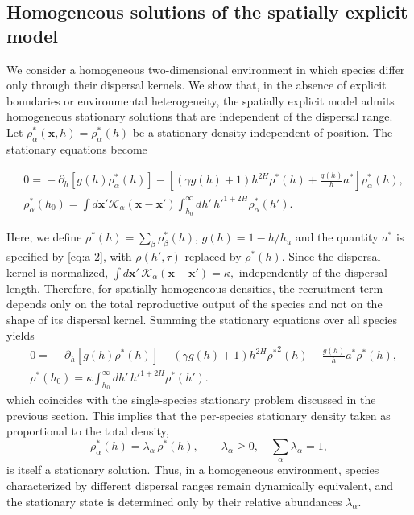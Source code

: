 \documentclass[aps,pre,twocolumn,superscriptaddress,10pt]{revtex4-2}
\begin{document}
\subsection*{Homogeneous solutions of the spatially explicit model}
We consider a homogeneous two-dimensional environment in which species differ only through their dispersal kernels. We show that, in the absence of explicit boundaries or environmental heterogeneity, the spatially explicit model admits homogeneous stationary solutions that are independent of the dispersal range.
Let $\rho_\alpha^*(\mathbf{x},h)=\rho_\alpha^*(h)$
be a stationary density independent of position. The stationary equations become
\begin{widetext}
\begin{align}
&\!\!\!0 =\!-\partial_h\!\left[g(h)\rho_\alpha^*(h)\right]\!-\!\left[\left(\gamma g(h)\!+\!1\right)h^{2H}\!\rho^*(h)\!+\!\frac{g(h)}{h}a^*\right]\rho_\alpha^*(h), \\
&\!\!\!\rho_\alpha^*(h_0) = \int d\mathbf{x}'\mathcal{K}_\alpha(\mathbf{x}-\mathbf{x}') \int_{h_0}^{\infty}\!\!dh'\,h'^{1+2H}\rho_\alpha^*(h').
\end{align}
\end{widetext}
Here, we define $\rho^*(h) = \sum_\beta \rho_\beta^*(h)$, $g(h)=1-h/h_u$ and the quantity $a^*$ is specified by \cref{eq:a-2}, with $\rho(h',\tau)$ replaced by $\rho^*(h)$.
Since the dispersal kernel is normalized, $\int d\mathbf{x}'\,\mathcal{K}_\alpha(\mathbf{x}-\mathbf{x}')=\kappa,$
independently of the dispersal length. Therefore, for spatially homogeneous densities, the recruitment term depends only on the total reproductive output of the species and not on the shape of its dispersal kernel.
Summing the stationary equations over all species yields
\begin{align}
&0 =\!-\partial_h\!\left[g(h)\rho^*(h)\right]\!-\!\left(\gamma g(h)\!+\!1\right)h^{2H}{\rho^*}^{2}(h)\!-\!\frac{g(h)}{h}a^*\rho^*(h),\\
&\rho^*(h_0) = \kappa \int_{h_0}^{\infty}\!\!dh'\,h'^{1+2H}\rho^*(h').
\end{align}
which coincides with the single-species stationary problem discussed in the previous section.
This implies that the per-species stationary density taken as proportional to the total density,
\begin{equation}
    \rho^*_{\alpha}(h) = \lambda_{\alpha}\,\rho^*(h),
    \qquad \lambda_\alpha \geq 0,\quad \sum_{\alpha} \lambda_{\alpha}=1,
\end{equation}
is itself a stationary solution. Thus, in a homogeneous environment, species characterized by different dispersal ranges remain dynamically equivalent, and the stationary state is determined only by their relative abundances $\lambda_\alpha$.
\end{document}
